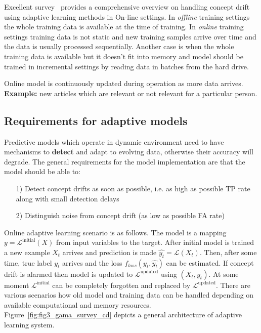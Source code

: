 Excellent survey~\cite{Gama2014a} provides a comprehensive overview on handling concept drift using adaptive learning methods in On-line settings.
In \textit{offline} training settings the whole training data is available at the time of training.
In \textit{online} training settings training data is not static and new training samples arrive over time and the data is usually processed sequentially.
Another case is when the whole training data is available but it doesn't fit into memory and model should be trained in incremental settings by reading data in batches from the hard drive. 

Online model is continuously updated during operation as more data arrives.
\textbf{Example:} new articles which are relevant or not relevant for a particular person.

\subsection{Requirements for adaptive models}
Predictive models which operate in dynamic environment need to have mechanisms to \textbf{detect} and adapt to evolving data, otherwise their accuracy will degrade. 
The general requirements for the model implementation are that the model should be able to:
\begin{itemize}
	\item [1)] Detect concept drifts as soon as possible, i.e. as high as possible TP rate along with small detection delays
	\item [2)] Distinguish noise from concept drift (as low as possible FA rate)
\end{itemize}
Online adaptive learning scenario is as follows.
The model is a mapping $y=\mathcal{L}^{\text{initial}}(X)$ from input variables to the target.
After initial model is trained a new example $X_t$ arrives and prediction is made $\hat{y_t} = \mathcal{L}(X_t)$.
Then, after some time, true label $y_t$ arrives and the loss $f_{loss}(y_t, \hat{y_t})$ can be estimated.
If concept drift is alarmed then model is updated to $\mathcal{L}^{\text{updated}}$ using $(X_t, y_t)$.
At some moment $\mathcal{L}^{\text{initial}}$ can be completely forgotten and replaced by $\mathcal{L}^{\text{updated}}$.
There are various scenarios how old model and training data can be handled depending on available computational and memory resources.
Figure~\ref{fig:fig3_gama_survey_cd} depicts a general architecture of adaptive learning system.
